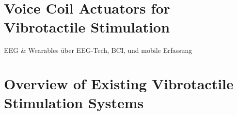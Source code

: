 \section{Voice Coil Actuators for Vibrotactile Stimulation}
EEG \& Wearables \cite{Guger.2012} \cite{Guger.2017} \cite{SebastianRomagosa.2020} \cite{Xu.2022} über EEG-Tech, BCI, und mobile Erfassung


\section{Overview of Existing Vibrotactile Stimulation Systems}




